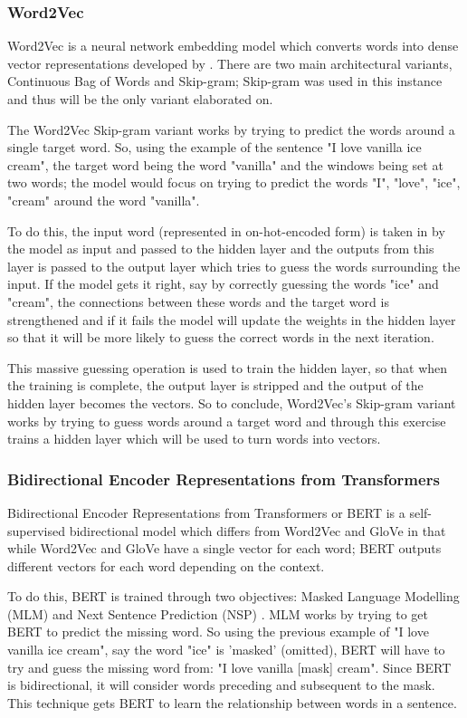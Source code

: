 \documentclass[stu,12pt,floatsintext,donotrepeattitle]{apa7}
\begin{document}
\subsubsection{Word2Vec}
Word2Vec is a neural network embedding model which converts words into dense vector representations developed by \textcite{word2vec}. There are two main architectural variants, Continuous Bag of Words and Skip-gram; Skip-gram was used in this instance and thus will be the only variant elaborated on. 

The Word2Vec Skip-gram variant works by trying to predict the words around a single target word. So, using the example of the sentence "I love vanilla ice cream", the target word being the word "vanilla" and the windows being set at two words; the model would focus on trying to predict the words "I", "love", "ice", "cream" around the word "vanilla". 

To do this, the input word (represented in on-hot-encoded form) is taken in by the model as input and passed to the hidden layer and the outputs from this layer is passed to the output layer which tries to guess the words surrounding the input. If the model gets it right, say by correctly guessing the words "ice" and "cream", the connections between these words and the target word is strengthened and if it fails the model will update the weights in the hidden layer so that it will be more likely to guess the correct words in the next iteration.

This massive guessing operation is used to train the hidden layer, so that when the training is complete, the output layer is stripped and the output of the hidden layer becomes the vectors. So to conclude, Word2Vec's Skip-gram variant works by trying to guess words around a target word and through this exercise trains a hidden layer which will be used to turn words into vectors. 

\subsubsection{Bidirectional Encoder Representations from Transformers}
Bidirectional Encoder Representations from Transformers or BERT is a self-supervised bidirectional model which differs from Word2Vec and GloVe in that while Word2Vec and GloVe have a single vector for each word; BERT outputs different vectors for each word depending on the context. 

To do this, BERT is trained through two objectives: Masked Language Modelling (MLM) and Next Sentence Prediction (NSP) \parencite{roberta}. MLM works by trying to get BERT to predict the missing word. So using the previous example of "I love vanilla ice cream", say the word "ice" is 'masked' (omitted), BERT will have to try and guess the missing word from: "I love vanilla [mask] cream". Since BERT is bidirectional, it will consider words preceding and subsequent to the mask. This technique gets BERT to learn the relationship between words in a sentence. 
\end{document}
